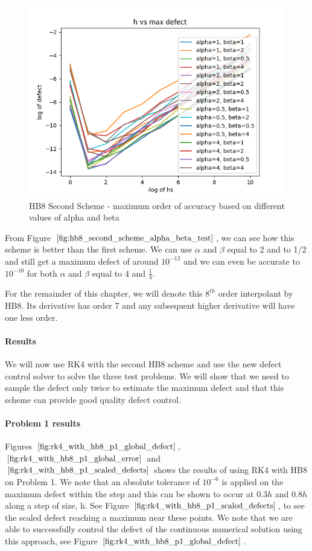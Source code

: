 \begin{figure}[H]
\centering
\includegraphics[width=0.7\linewidth]{./figures/hb8_second_scheme_alpha_beta_test}
\caption{HB8 Second Scheme - maximum order of accuracy based on different values of alpha and beta}
\label{fig:hb8_second_scheme_alpha_beta_test}
\end{figure}

From Figure $\ref{fig:hb8_second_scheme_alpha_beta_test}$, we can see how this scheme is better than the first scheme. We can use $\alpha$ and $\beta$ equal to 2 and to 1/2 and still get a maximum defect of around $10^{-12}$ and we can even be accurate to $10^{-10}$ for both $\alpha$ and $\beta$ equal to 4 and $\frac{1}{4}$. 

For the remainder of this chapter, we will denote this $8^{th}$ order interpolant by HB8. Its derivative has order 7 and any subsequent higher derivative will have one less order.

\paragraph{Results}
We will now use RK4 with the second HB8 scheme and use the new defect control solver to solve the three test problems. We will show that we need to sample the defect only twice to estimate the maximum defect and that this scheme can provide good quality defect control.

\paragraph{Problem 1 results}
Figures $\ref{fig:rk4_with_hb8_p1_global_defect}$, $\ref{fig:rk4_with_hb8_p1_global_error}$ and $\ref{fig:rk4_with_hb8_p1_scaled_defects}$ shows the results of using RK4 with HB8 on Problem 1. We note that an absolute tolerance of $10^{-6}$ is applied on the maximum defect within the step and this can be shown to occur at $0.3h$ and $0.8h$ along a step of size, h. See Figure $\ref{fig:rk4_with_hb8_p1_scaled_defects}$, to see the scaled defect reaching a maximum near these points. We note that we are able to successfully control the defect of the continuous numerical solution using this approach, see Figure $\ref{fig:rk4_with_hb8_p1_global_defect}$. 


